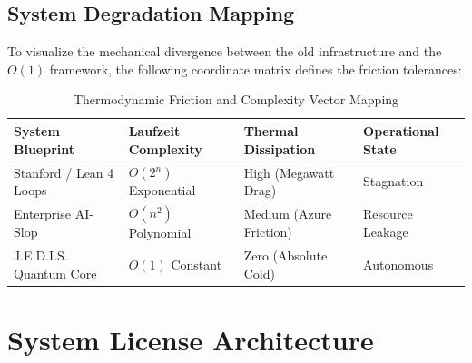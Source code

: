 \documentclass[11pt,a4paper]{article}
\begin{document}
\subsection{System Degradation Mapping}
To visualize the mechanical divergence between the old infrastructure and the $O(1)$ framework, the following coordinate matrix defines the friction tolerances:

\begin{table}[h]
\centering
\caption{Thermodynamic Friction and Complexity Vector Mapping}
\vspace{0.3cm}
\small
\begin{tabular}{p{4.5cm}p{3.2cm}p{3.2cm}p{3.2cm}}
\toprule
\textbf{System Blueprint} & \textbf{Laufzeit Complexity} & \textbf{Thermal Dissipation} & \textbf{Operational State} \\
\midrule
Stanford / Lean 4 Loops & $O(2^n)$ Exponential & High (Megawatt Drag) & Stagnation \\
\addlinespace
Enterprise AI-Slop & $O(n^2)$ Polynomial & Medium (Azure Friction) & Resource Leakage \\
\addlinespace
J.E.D.I.S. Quantum Core & $O(1)$ Constant & Zero (Absolute Cold) & Autonomous \\
\bottomrule
\end{tabular}
\end{table}

\section{System License Architecture}
\end{document}
